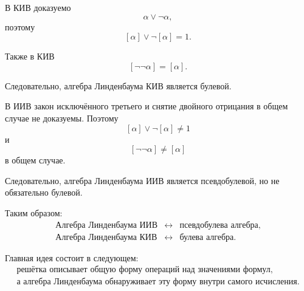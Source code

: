 \documentclass[12pt,a4paper,oneside,openany]{book}
\theoremstyle{definition}
\theoremstyle{plain}
\theoremstyle{remark}
\begin{document}
В КИВ доказуемо
\[
\alpha\lor\neg\alpha,
\]
поэтому
\[
[\alpha]\vee\neg[\alpha]=1.
\]

Также в КИВ
\[
[\neg\neg\alpha]=[\alpha].
\]

Следовательно, алгебра Линденбаума КИВ является булевой.

В ИИВ закон исключённого третьего и снятие двойного отрицания в общем
случае не доказуемы. Поэтому
\[
[\alpha]\vee\neg[\alpha]\neq1
\]
и
\[
[\neg\neg\alpha]\neq[\alpha]
\]
в общем случае.

Следовательно, алгебра Линденбаума ИИВ является псевдобулевой, но не
обязательно булевой.

Таким образом:
\[
\boxed{
\begin{array}{ccc}
\text{Алгебра Линденбаума ИИВ}
&
\longleftrightarrow
&
\text{псевдобулева алгебра},
\\[2mm]
\text{Алгебра Линденбаума КИВ}
&
\longleftrightarrow
&
\text{булева алгебра}.
\end{array}
}
\]

Главная идея состоит в следующем:
\[
\boxed{
\begin{array}{c}
\text{решётка описывает общую форму операций над значениями формул,}
\\[1mm]
\text{а алгебра Линденбаума обнаруживает эту форму внутри самого
исчисления.}
\end{array}
}
\]
\end{document}
